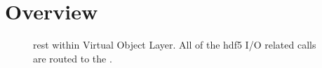 \documentclass[../users_guide.tex]{subfiles}
\begin{document}
\section{Overview}

\begin{figure}
\centering

\caption{\acrshort{rest} within Virtual Object Layer. All of the \acrshort{hdf5} I/O related calls are
routed to the \rvc{}.}
\label{fig:vol}
\end{figure}
\end{document}
